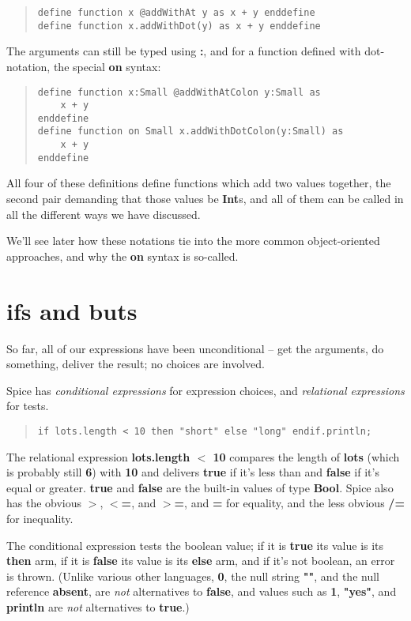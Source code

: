 \documentclass{report}
\begin{document}
\begin{quote}
\begin{verbatim}
define function x @addWithAt y as x + y enddefine
define function x.addWithDot(y) as x + y enddefine
\end{verbatim}
\end{quote}
The arguments can still be typed using {\bf :}, and for a function
defined with dot-notation, the special {\bf on} syntax:

\begin{quote}
\begin{verbatim}
define function x:Small @addWithAtColon y:Small as
    x + y
enddefine
define function on Small x.addWithDotColon(y:Small) as
    x + y
enddefine
\end{verbatim}
\end{quote}
All four of these definitions define functions which add two values together,
the second pair demanding that those values be {\bf Int}s, and all of them can be
called in all the different ways we have discussed.

We'll see later how these notations tie into the more common object-oriented
approaches, and why the {\bf on} syntax is so-called.\chapter{ifs and buts}


So far, all of our expressions have been unconditional -- get the arguments,
do something, deliver the result; no choices are involved.

Spice has {\em conditional expressions} for expression choices, and {\em relational
expressions} for tests.

\begin{quote}
\begin{verbatim}
if lots.length < 10 then "short" else "long" endif.println;
\end{verbatim}
\end{quote}
The relational expression {\bf lots.length $<$ 10} compares the length of {\bf lots}
(which is probably still {\bf 6}) with {\bf 10} and delivers {\bf true} if it's less than
and {\bf false} if it's equal or greater. {\bf true} and {\bf false} are the built-in
values of type {\bf Bool}. Spice also has the obvious {\bf $>$}, {\bf $<$=}, and {\bf $>$=}, and {\bf =}
for equality, and the less obvious {\bf /=} for inequality.

The conditional expression tests the boolean value; if it is {\bf true} its value
is its {\bf then} arm, if it is {\bf false} its value is its {\bf else} arm, and if it's
not boolean, an error is thrown. (Unlike various other languages, {\bf 0}, the
null string {\bf ""}, and the null reference {\bf absent}, are {\em not}
alternatives to {\bf false}, and values such as {\bf 1}, {\bf "yes"}, and {\bf println} are
{\em not} alternatives to {\bf true}.)
\end{document}
